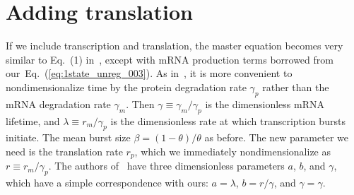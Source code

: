 \documentclass[12pt]{article}%
\newcommand{\eref}[1]{Eq.~(\ref{#1})}
\begin{document}
\section{Adding translation}
If we include transcription and translation, the master equation becomes
very similar to Eq.~(1) in~\cite{Shahrezaei2008}, except with mRNA
production terms borrowed from our~\eref{eq:1state_unreg_003}.
As in~\cite{Shahrezaei2008}, it is more convenient to nondimensionalize
time by the protein degradation rate $\gamma_p$ rather than the mRNA
degradation rate $\gamma_m$.
Then $\gamma\equiv\gamma_m/\gamma_p$ is the dimensionless mRNA lifetime,
and $\lambda\equiv r_m/\gamma_p$ is the dimensionless rate at which
transcription bursts initiate.
The mean burst size $\beta = (1-\theta)/\theta$ as before.
The new parameter we need is the translation rate $r_p$,
which we immediately nondimensionalize as $r\equiv r_m/\gamma_p$.
The authors of~\cite{Shahrezaei2008} have three dimensionless parameters
$a$, $b$, and $\gamma$, which have a simple correspondence with ours:
$a=\lambda$, $b=r/\gamma$, and $\gamma=\gamma$.
\end{document}
